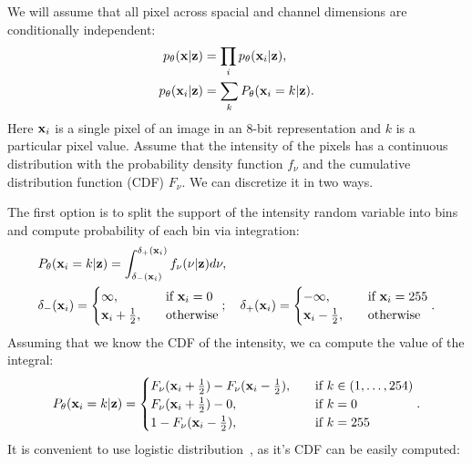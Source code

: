We will assume that all pixel across spacial and channel dimensions are conditionally independent:
\begin{align}
    p_{\theta}({\mathbf{x}}|{\mathbf{z}}) &= \prod_i p_{\theta}({\mathbf{x}}_i|{\mathbf{z}}),\\
    p_{\theta}({\mathbf{x}}_i|{\mathbf{z}}) &= \sum_{k} P_{\theta}({\mathbf{x}}_i = k|{\mathbf{z}}).
\end{align}
Here ${\mathbf{x}}_i$ is a single pixel of an image in an 8-bit representation and $k$ is a particular pixel value. 
Assume that the intensity of the pixels has a continuous distribution with the probability density function $f_{\nu}$ and the cumulative distribution function (CDF) $F_{\nu}$. We can discretize it in two ways. 

The first option is to split the support of the intensity random variable into bins and compute probability of each bin via integration:
\begin{equation}\label{eq:intro_int_discr}
\begin{aligned}
    &P_{\theta}(\rvx_i = k|\rvz) = \int_{\delta_{-}(\rvx_i)}^{\delta_{+}(\rvx_i)} f_{\nu}(\nu|\rvz)d\nu,\\
    &\delta_{-}(\rvx_i) =
    \begin{cases}
        \infty,\quad &\text{if } \rvx_i = 0\\
        \rvx_i + \frac12,\quad&\text{otherwise}
    \end{cases};  \quad
    \delta_{+}(\rvx_i) =
    \begin{cases}
        -\infty,\quad &\text{if } \rvx_i = 255\\
        \rvx_i - \frac12,\quad&\text{otherwise}
    \end{cases}.
\end{aligned}
\end{equation}
Assuming that we know the CDF of the intensity, we ca compute the value of the integral:
\begin{equation}
    P_{\theta}({\mathbf{x}}_i = k|{\mathbf{z}}) =\begin{cases}
    F_{\nu}({\mathbf{x}}_i + \frac{1}{2}) - F_{\nu}({\mathbf{x}}_i - \frac{1}{2}),\quad &\text{if } k \in (1, \dots, 254) \\
    F_{\nu}({\mathbf{x}}_i + \frac{1}{2}) - 0,\quad &\text{if } k = 0 \\
    1 - F_{\nu}({\mathbf{x}}_i - \frac{1}{2}),\quad &\text{if } k = 255 \\
    \end{cases}.
\end{equation}
It is convenient to use logistic distribution~\cite{kingma2016improved}, as it's CDF can be easily computed:
